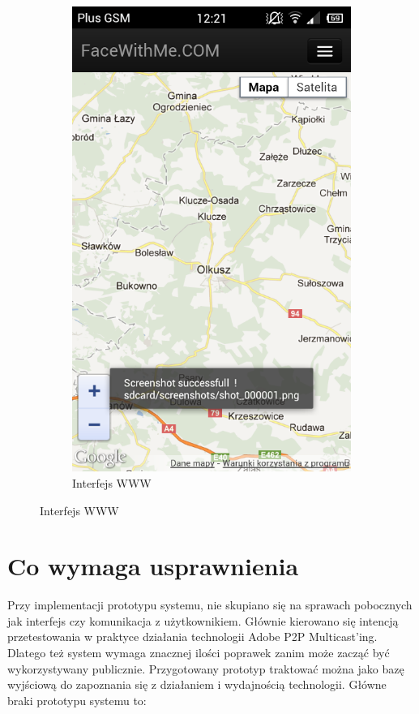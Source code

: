 \begin{figure}[h]
\begin{subfigure}[b]{0.3\textwidth}
                \centering
                \includegraphics[width=\textwidth]{img/screens/mobile_broadcaster/interfejs-www.png}
                \caption{Interfejs WWW}
        \end{subfigure}
\end{figure}

\section{Co wymaga usprawnienia}

Przy implementacji prototypu systemu, nie skupiano się na sprawach pobocznych jak interfejs czy komunikacja z użytkownikiem. Głównie kierowano się intencją przetestowania w praktyce działania technologii Adobe P2P Multicast'ing. Dlatego też system wymaga znacznej ilości poprawek zanim może zacząć być wykorzystywany publicznie. Przygotowany prototyp traktować można jako bazę wyjściową do zapoznania się z działaniem i wydajnością technologii. Główne braki prototypu systemu to:


